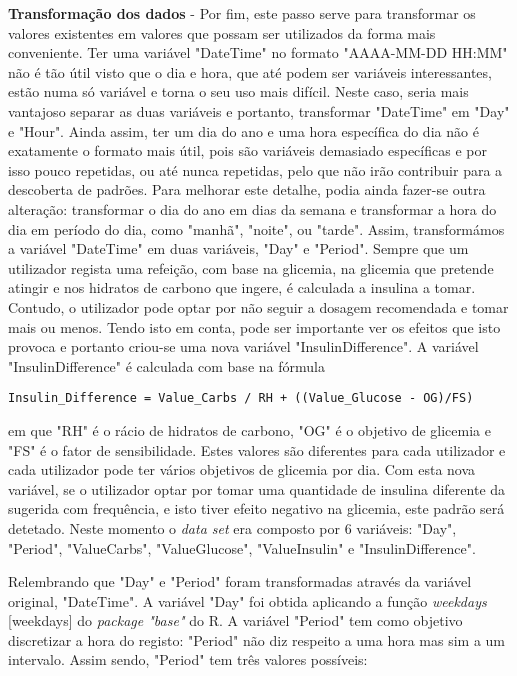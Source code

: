 \textbf{Transformação dos dados} - Por fim, este passo serve para transformar os valores existentes em valores que possam ser utilizados da forma mais conveniente. Ter uma variável "DateTime" no formato "AAAA-MM-DD HH:MM" não é tão útil visto que o dia e hora, que até podem ser variáveis interessantes, estão numa só variável e torna o seu uso mais difícil. Neste caso, seria mais vantajoso separar as duas variáveis e portanto, transformar "DateTime" em "Day" e "Hour". Ainda assim, ter um dia do ano e uma hora específica do dia não é exatamente o formato mais útil, pois são variáveis demasiado específicas e por isso pouco repetidas, ou até nunca repetidas, pelo que não irão contribuir para a descoberta de padrões. Para melhorar este detalhe, podia ainda fazer-se outra alteração: transformar o dia do ano em dias da semana e transformar a hora do dia em período do dia, como "manhã", "noite", ou "tarde". Assim, transformámos a variável "DateTime" em duas variáveis, "Day" e "Period".
Sempre que um utilizador regista uma refeição, com base na glicemia, na glicemia que pretende atingir e nos hidratos de carbono que ingere, é calculada a insulina a tomar. Contudo, o utilizador pode optar por não seguir a dosagem recomendada e tomar mais ou menos. Tendo isto em conta, pode ser importante ver os efeitos que isto provoca e portanto criou-se uma nova variável "Insulin\textunderscore Difference". 
A variável "Insulin\textunderscore Difference" é calculada com base na fórmula
\begin{lstlisting}[caption=Fórmula para calcular insulina a ser tomada, label=form]
Insulin_Difference = Value_Carbs / RH + ((Value_Glucose - OG)/FS)
\end{lstlisting}


em que "RH" é o rácio de hidratos de carbono, "OG"  é o objetivo de glicemia e "FS"  é o fator de sensibilidade. Estes valores são diferentes para cada utilizador e cada utilizador pode ter vários objetivos de glicemia por dia. 
Com esta nova variável, se o utilizador optar por tomar uma quantidade de insulina diferente da sugerida com frequência, e isto tiver efeito negativo na glicemia, este padrão será detetado. 
Neste momento o \textit{data set} era composto por 6 variáveis: "Day", "Period", "Value\textunderscore Carbs", "Value\textunderscore Glucose", "Value\textunderscore Insulin" e "Insulin\textunderscore Difference".

Relembrando que "Day" e "Period" foram transformadas através da variável original, "DateTime". A variável "Day" foi obtida aplicando a função \textit{weekdays} [weekdays] do \textit{package "base"} do R. A variável "Period" tem como objetivo discretizar a hora do registo: "Period" não diz respeito a uma hora mas sim a um intervalo. Assim sendo, "Period" tem três valores possíveis:

